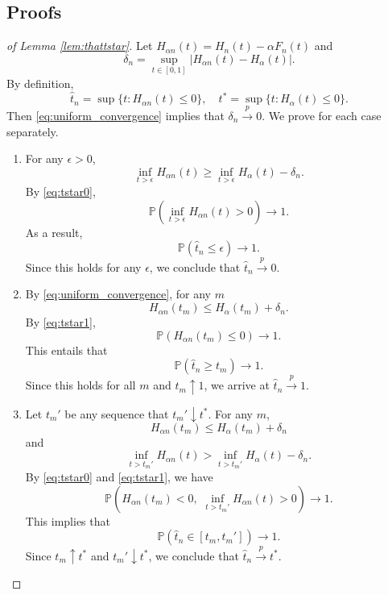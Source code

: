 \documentclass{biometrika}
\newcommand{\eps}{\epsilon}
\newcommand{\lb}{\left(}
\newcommand{\rb}{\right)}
\renewcommand{\P}{\mathbb{P}}
\newcommand{\1}{\mathbf{1}}
\begin{document}
\subsection{Proofs}\label{subapp:power_proof}
\begin{proof}[of Lemma \ref{lem:thattstar}]
Let $H_{\alpha n}(t) = H_{n}(t) - \alpha F_{n}(t)$ and 
\[\delta_{n} = \sup_{t\in [0, 1]}|H_{\alpha n}(t) - H_{\alpha}(t)|.\]
By definition, 
\[\hat{t}_{n} = \sup\{t: H_{\alpha n}(t)\le 0\}, \quad t^{*} = \sup\{t: H_{\alpha}(t)\le 0\}.\]
Then \eqref{eq:uniform_convergence} implies that $\delta_{n}\stackrel{p}{\rightarrow}0$. We prove for each case separately.
  \begin{enumerate}
  \item For any $\eps > 0$, 
    \[\inf_{t > \eps}H_{\alpha n}(t) \ge\inf_{t > \eps} H_{\alpha}(t) - \delta_{n}.\]
By \eqref{eq:tstar0}, 
\[\P\lb \inf_{t > \eps}H_{\alpha n}(t) > 0\rb\rightarrow 1.\]
As a result,
\[\P(\hat{t}_{n}\le \eps)\rightarrow 1.\]
Since this holds for any $\eps$, we conclude that $\hat{t}_{n}\stackrel{p}{\rightarrow} 0$. 
  \item By \eqref{eq:uniform_convergence}, for any $m$
\[H_{\alpha n}(t_{m}) \le H_{\alpha}(t_{m}) + \delta_{n}.\]
By \eqref{eq:tstar1}, 
\[\P(H_{\alpha n}(t_{m})\le 0)\rightarrow 1.\]
This entails that
\[\P(\hat{t}_{n}\ge t_{m})\rightarrow 1.\]
Since this holds for all $m$ and $t_{m}\uparrow 1$, we arrive at $\hat{t}_{n}\stackrel{p}{\rightarrow} 1$.
\item Let $t_{m}'$ be any sequence that $t_{m}'\downarrow t^{*}$. For any $m$, 
\[H_{\alpha n}(t_{m})\le H_{\alpha}(t_{m}) + \delta_{n}\]
and 
\[\inf_{t > t_{m}'}H_{\alpha n}(t) > \inf_{t > t_{m}'}H_{\alpha}(t) - \delta_{n}.\]
By \eqref{eq:tstar0} and \eqref{eq:tstar1}, we have
\[\P\lb H_{\alpha n}(t_{m}) < 0, \,\, \inf_{t > t_{m}'}H_{\alpha n}(t) > 0\rb\rightarrow 1.\]
This implies that
\[\P(\hat{t}_{n}\in [t_{m}, t_{m}'])\rightarrow 1.\]
Since $t_{m}\uparrow t^{*}$ and $t_{m}'\downarrow t^{*}$, we conclude that $\hat{t}_{n}\stackrel{p}{\rightarrow}t^{*}$.
  \end{enumerate}
\end{proof}
\end{document}
